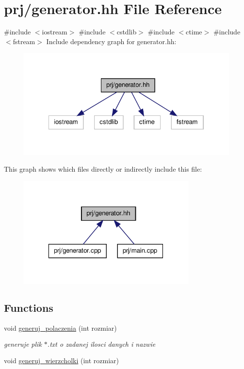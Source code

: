\hypertarget{generator_8hh}{\section{prj/generator.hh \-File \-Reference}
\label{generator_8hh}
}
{\ttfamily \#include $<$iostream$>$}\*
{\ttfamily \#include $<$cstdlib$>$}\*
{\ttfamily \#include $<$ctime$>$}\*
{\ttfamily \#include $<$fstream$>$}\*
\-Include dependency graph for generator.\-hh\-:\nopagebreak
\begin{figure}[H]
\begin{center}
\leavevmode
\includegraphics[width=322pt]{generator_8hh__incl}
\end{center}
\end{figure}
\-This graph shows which files directly or indirectly include this file\-:\nopagebreak
\begin{figure}[H]
\begin{center}
\leavevmode
\includegraphics[width=256pt]{generator_8hh__dep__incl}
\end{center}
\end{figure}
\subsection*{\-Functions}
\begin{DoxyCompactItemize}
\item 
void \hyperlink{generator_8hh_a242a9701c409c59f651874736f8cef01}{generuj\-\_\-polaczenia} (int rozmiar)
\begin{DoxyCompactList}\small\item\em generuje plik $\ast$.txt o zadanej ilosci danych i nazwie \end{DoxyCompactList}\item 
void \hyperlink{generator_8hh_ae448f3fbbbd7702dc3faea2a133947d8}{generuj\-\_\-wierzcholki} (int rozmiar)
\end{DoxyCompactItemize}


